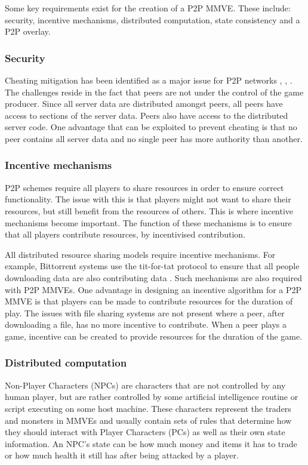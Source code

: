 Some key requirements exist for the creation of a P2P MMVE. These include: security, incentive mechanisms, distributed computation, state consistency and a P2P overlay.

\subsubsection{Security}

Cheating mitigation has been identified as a major issue for P2P networks \cite{knutsson_p2p_first}, \cite{challenges_p2p_gaming}, \cite{cheat_proof_event_ordering}. The challenges reside in the fact that peers are not under the control of the game producer. Since all server data are distributed amongst peers, all peers have access to sections of the server data. Peers also have access to the distributed server code. One advantage that can be exploited to prevent cheating is that no peer contains all server data and no single peer has more authority than another.

\subsubsection{Incentive mechanisms}
P2P schemes require all players to share resources in order to ensure correct functionality. The issue with this is that players might not want to share their resources, but still benefit from the resources of others. This is where incentive mechanisms become important. The function of these mechanisms is to ensure that all players contribute resources, by incentivised contribution.

All distributed resource sharing models require incentive mechanisms. For example, Bittorrent systems use the tit-for-tat protocol to ensure that all people downloading data are also contributing data \cite{tit_for_tat}. Such mechanisms are also required with P2P MMVEs. One advantage in designing an incentive algorithm for a P2P MMVE is that players can be made to contribute resources for the duration of play. The issues with file sharing systems are not present where a peer, after downloading a file, has no more incentive to contribute. When a peer plays a game, incentive can be created to provide resources for the duration of the game.

\subsubsection{Distributed computation}

Non-Player Characters (NPCs) are characters that are not controlled by any human player, but are rather controlled by some artificial intelligence routine or script executing on some host machine. These characters represent the traders and monsters in MMVEs and usually contain sets of rules that determine how they should interact with Player Characters (PCs) as well as their own state information. An NPC's state can be how much money and items it has to trade or how much health it still has after being attacked by a player.

